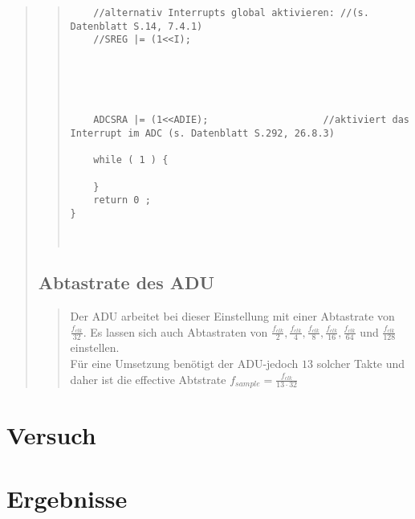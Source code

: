 \begin{quote}
\begin{quote}
\begin{lstlisting}
    //alternativ Interrupts global aktivieren: //(s. Datenblatt S.14, 7.4.1)
    //SREG |= (1<<I);                           
                                            
    



    ADCSRA |= (1<<ADIE);                    //aktiviert das Interrupt im ADC (s. Datenblatt S.292, 26.8.3)

    while ( 1 ) {

    }
    return 0 ;
}



\end{lstlisting}         
    \end{quote}

    \subsection{Abtastrate des ADU}
    \begin{quote}
        Der ADU arbeitet bei dieser Einstellung mit einer Abtastrate von $\frac{f_{clk}}{32}$. Es lassen sich auch
        Abtastraten von $\frac{f_{clk}}{2}, \frac{f_{clk}}{4}, \frac{f_{clk}}{8}, \frac{f_{clk}}{16},
        \frac{f_{clk}}{64}$ und $\frac{f_{clk}}{128}$ einstellen.\\
        Für eine Umsetzung benötigt der ADU-jedoch $13$ solcher Takte und daher ist die effective Abtstrate $f_{sample}
        = \frac{f_{clk}}{13 \cdot   32}$
    \end{quote}

\end{quote}


\section{Versuch}
\begin{quote}
	
\end{quote}


\section{Ergebnisse}
\begin{quote}
	
\end{quote}





